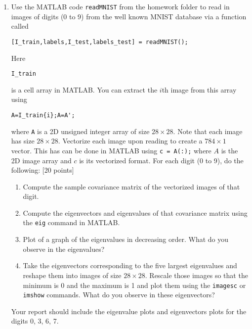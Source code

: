 \documentclass[11pt]{article}
\begin{document}
\begin{enumerate}
\item Use the MATLAB code \texttt{readMNIST} from the homework folder to read in images of digits (0 to 9) from the well known MNIST database via a function called \begin{verbatim}[I_train,labels,I_test,labels_test] = readMNIST(); \end{verbatim}
Here \begin{verbatim}I_train\end{verbatim} is a cell array in MATLAB. You can extract the $i$th image from this array using 
\begin{verbatim}A=I_train{i};A=A';\end{verbatim} where \texttt{A} is a 2D unsigned integer array of size $28 \times 28$. Note that each image has size $28 \times 28$. Vectorize each image upon reading to create a $784 \times 1$ vector. This has can be done in MATLAB using \texttt{c = A(:);} where $A$ is the 2D image array and $c$ is its vectorized format. For each digit (0 to 9), do the following: \textsf{[20 points]}
\begin{enumerate}
    \item Compute the sample covariance matrix of the vectorized images of that digit.
    \item Compute the eigenvectors and eigenvalues of that covariance matrix using the \texttt{eig} command in MATLAB.
    \item Plot of a graph of the eigenvalues in decreasing order. What do you observe in the eigenvalues?
    \item Take the eigenvectors corresponding to the five largest eigenvalues and reshape them into images of size $28 \times 28$. Rescale those images so that the minimum is 0 and the maximum is 1 and plot them using the \texttt{imagesc} or \texttt{imshow} commands. What do you observe in these eigenvectors?  
\end{enumerate}
Your report should include the eigenvalue plots and eigenvectors plots for the digits 0, 3, 6, 7. 
\end{enumerate}
\end{document}
